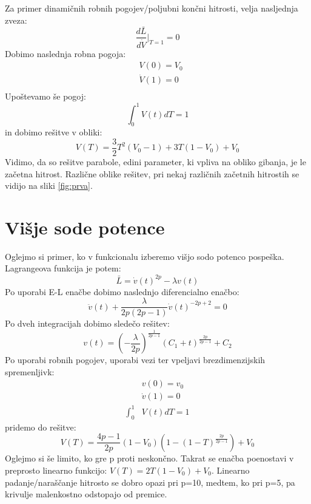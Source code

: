 \documentclass[11pt]{article}
\numberwithin{equation}{section} %
\numberwithin{table}{section} %
\begin{document}
Za primer dinamičnih robnih pogojev/poljubni končni hitrosti, velja nasljednja zveza:
\begin{equation}
\label{eq-resitev-prva}
\frac{d \bar{L}}{d \dot{V}}\Big|_{T=1}=0
\end{equation}
Dobimo naslednja robna pogoja:
\begin{equation*}
\begin{aligned}
&V(0)=V_0\\
&\dot{V}(1)=0\\
\end{aligned}
\end{equation*}
Upoštevamo še pogoj:
\begin{equation}
\label{eq-norma}
\int_{0}^{1} V(t) dT=1
\end{equation}
in dobimo rešitve v obliki:
\begin{equation}
\label{eq-v-ot-prva}
V(T)=\frac{3}{2}T^2(V_0-1)+3T(1-V_0)+V_0
\end{equation}
Vidimo, da so rešitve parabole, edini parameter, ki vpliva na obliko gibanja, je le začetna hitrost. Različne oblike rešitev, pri nekaj različnih začetnih hitrostih se vidijo na sliki \ref{fig:prva}.





\section{Višje sode potence}

Oglejmo si primer, ko v funkcionalu izberemo višjo sodo potenco pospeška. Lagrangeova funkcija je potem:
\begin{equation}
\bar{L}=\dot{v}(t)^{2p}-\lambda v(t)
\end{equation}
Po uporabi E-L enačbe dobimo naslednjo diferencialno enačbo:
\begin{equation}
\ddot{v}(t)+\frac{\lambda}{2p(2p-1)}\dot{v}(t)^{-2p+2}=0
\end{equation}
Po dveh integracijah dobimo sledečo rešitev:
\begin{equation}
v(t)=(-\frac{\lambda}{2p})^{\frac{1}{2p-1}}(C_1+t)^{\frac{2p}{2p-1}}+C_2
\end{equation}
Po uporabi robnih pogojev, uporabi vezi ter vpeljavi brezdimenzijskih spremenljivk:
\begin{equation*}
\begin{aligned}
&v(0)=v_0\\
&\dot{v}(1)=0\\
\int_{0}^{1}& V(t) dT=1
\end{aligned}
\end{equation*}
pridemo do rešitve:
\begin{equation}
V(T)=\frac{4p-1}{2p}(1-V_0)(1-(1-T)^{\frac{2p}{2p-1}})+V_0
\end{equation}
Oglejmo si še limito, ko gre p proti neskončno. Takrat se enačba poenostavi v preprosto linearno funkcijo: $V(T)=2T(1-V_0)+V_0$. Linearno padanje/naraščanje hitrosto se dobro opazi pri p=10, medtem, ko pri p=5, pa krivulje malenkostno odstopajo od premice.
\end{document}
